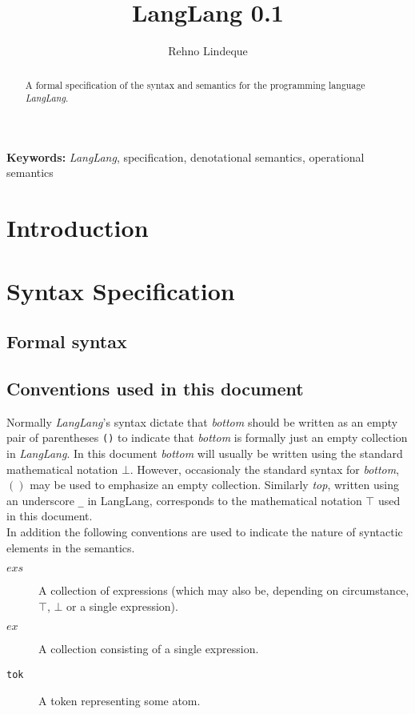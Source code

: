 \documentclass[a4paper,11pt]{article}
\begin{document}
\title{LangLang 0.1}
\author{Rehno Lindeque}

\maketitle

\begin{abstract}
A formal specification of the syntax and semantics for the programming language \textsl{LangLang}.
\end{abstract}
\textbf{Keywords:} \textsl{LangLang}, specification, denotational semantics, operational semantics

\section{Introduction}

\section{Syntax Specification}
\subsection{Formal syntax}

\subsection{Conventions used in this document}
\label{sec:conventions}

Normally \textsl{LangLang}'s syntax dictate that \emph{bottom} should be written as an empty pair of parentheses \texttt{()} to indicate that \emph{bottom} is formally just an empty collection in \textsl{LangLang}.
In this document \emph{bottom} will usually be written using the standard mathematical notation $\bot$.
However, occasionaly the standard syntax for \emph{bottom}, $()$ may be used to emphasize an empty collection.
Similarly \emph{top}, written using an underscore \texttt{\_} in LangLang, corresponds to the mathematical notation $\top$ used in this document.\\

In addition the following conventions are used to indicate the nature of syntactic elements in the semantics.

\begin{description}
  \item[$exs$] A collection of expressions (which may also be, depending on circumstance, $\top$, $\bot$ or a single expression).
  \item[$ex$] A collection consisting of a single expression.
  \item[\texttt{tok}] A token representing some atom.
\end{description}
\end{document}
